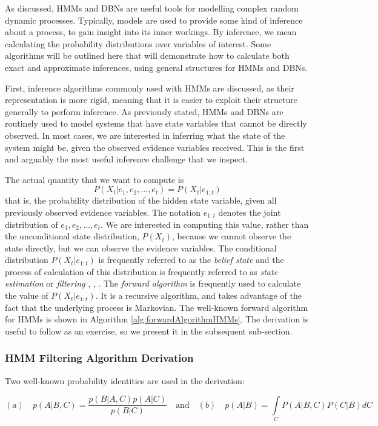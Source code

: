As discussed, HMMs and DBNs are useful tools for modelling complex random dynamic processes. Typically, models are used to provide some kind of inference about a process, to gain insight into its inner workings. By inference, we mean calculating the probability distributions over variables of interest. Some algorithms will be outlined here that will demonstrate how to calculate both exact and approximate inferences, using general structures for HMMs and DBNs. \par

First, inference algorithms commonly used with HMMs are discussed, as their representation is more rigid, meaning that it is easier to exploit their structure generally to perform inference. As previously stated, HMMs and DBNs are routinely used to model systems that have state variables that cannot be directly observed. In most cases, we are interested in inferring what the state of the system might be, given the observed evidence variables received. This is the first and arguably the most useful inference challenge that we inspect.

The actual quantity that we want to compute is 
\[P(X_t | e_1, e_2, ..., e_t) = P(X_t | e_{1:t})\]
that is, the probability distribution of the hidden state variable, given all previously observed evidence variables. The notation $e_{1:t}$ denotes the joint distribution of $e_1, e_2, ..., e_t$. We are interested in computing this value, rather than the unconditional state distribution, $P(X_t)$, because we cannot observe the state directly, but we can observe the evidence variables. The conditional distribution $P(X_t | e_{1:t})$ is frequently referred to as the \textit{belief state} and the process of calculation of this distribution is frequently referred to as \textit{state estimation} or \textit{filtering} \cite{AIAMA}, \cite{Thrun:2005:ProbabilisticRobotics}, \cite{KollerPGM}. The \textit{forward algorithm} is frequently used to calculate the value of $P(X_t | e_{1:t})$. It is a recursive algorithm, and takes advantage of the fact that the underlying process is Markovian. The well-known forward algorithm for HMMs is shown in Algorithm \ref{alg:forwardAlgorithmHMMs}. The derivation is useful to follow as an exercise, so we present it in the subsequent sub-section.
\subsubsection{HMM Filtering Algorithm Derivation} 
\label{section:HMMFiltering}
Two well-known probability identities are used in the derivation: 
\begin{center}
\end{center}
\[(a) \quad p(A | B, C) = \frac{p(B | A, C) p(A | C)}{p(B | C)} \quad \text{and} \quad (b) \quad p(A | B) = \int\limits_{C}P(A | B, C) P(C | B)dC\]

